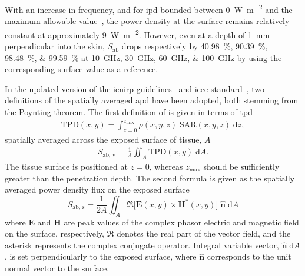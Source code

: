 With an increase in frequency, and for \gls{ipd} bounded between \SI{0}{\watt\per\m\squared} and the maximum allowable value~\cite{ICNIRP2020Guidelines,IEEE2019Standard}, the power density at the surface remains relatively constant at approximately \SI{9}{\watt\per\m\squared}.
However, even at a depth of \SI{1}{\mm} perpendicular into the skin, $S_\text{ab}$ drops respectively by \SIlist{40.98;90.39;98.48;99.59}{\percent} at \SIlist{10;30;60;100}{\GHz} by using the corresponding surface value as a reference.

In the updated version of the \gls{icnirp} guidelines~\cite{ICNIRP2020Guidelines} and \gls{ieee} standard~\cite{IEEE2019Standard}, two definitions of the spatially averaged \gls{apd} have been adopted, both stemming from the Poynting theorem.
The first definition of is given in terms of \gls{tpd}~\cite{Funahashi2018Area-averaged}
\begin{align}
    \label{eqn:tpd}
    \text{TPD}(x, y) = \int_{z = 0}^{z_\text{max}} \rho(x, y, z) \; \text{SAR}(x, y, z) \; \mathrm{d}z,
\end{align}
spatially averaged across the exposed surface of tissue, $A$
\begin{align}
    \label{eqn:apd_1}
    S_\text{ab, v} = \frac{1}{A} \iint_{A} \text{TPD}(x, y) \; \mathrm{d}A.
\end{align}
The tissue surface is positioned at $z = 0$, whereas $z_\text{max}$ should be sufficiently greater than the penetration depth.
The second formula is given as the spatially averaged power density flux on the exposed surface
\begin{equation}
    \label{eqn:apd_2} 
    S_\text{ab, s} = \frac{1}{2A} \iint_{A} \Re \big[\mathbf{E}(x, y) \times \mathbf{H}^*(x, y) \big] \; \mathbf{\hat n} \; \mathrm{d}A
\end{equation}
where $\mathbf{E}$ and $\mathbf{H}$ are peak values of the complex phasor electric and magnetic field on the surface, respectively, $\Re$ denotes the real part of the vector field, and the asterisk represents the complex conjugate operator.
Integral variable vector, $\mathbf{\hat n} \; \mathrm{d}A$, is set perpendicularly to the exposed surface, where  $\mathbf{\hat n}$ corresponds to the unit normal vector to the surface.

